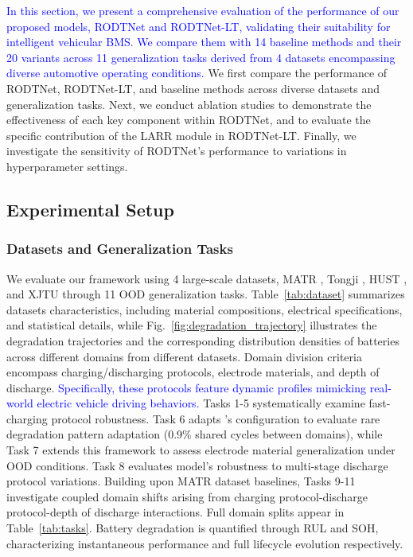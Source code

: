 \documentclass[lettersize,journal]{IEEEtran}
\newcommand{\rev}[1]{\textcolor{blue}{#1}}
\begin{document}
\rev{In this section, we present a comprehensive evaluation of the performance of our proposed models, RODTNet and RODTNet-LT, validating their suitability for intelligent vehicular BMS.
We compare them with 14 baseline methods and their 20 variants across 11 generalization tasks derived from 4 datasets encompassing diverse automotive operating conditions.}
We first compare the performance of RODTNet, RODTNet-LT, and baseline methods across diverse datasets and generalization tasks.
Next, we conduct ablation studies to demonstrate the effectiveness of each key component within RODTNet, and to evaluate the specific contribution of the LARR module in RODTNet-LT.
Finally, we investigate the sensitivity of RODTNet's performance to variations in hyperparameter settings.

\subsection{Experimental Setup}\label{subsec:experimental_setup}
  
\subsubsection{Datasets and Generalization Tasks}

We evaluate our framework using 4 large-scale datasets, MATR \cite{severson2019data, attia2020closed}, Tongji \cite{zhu2022data}, HUST \cite{D2EE01676A}, and XJTU \cite{wang2024physics} through 11 OOD generalization tasks. Table~\ref{tab:dataset} summarizes datasets characteristics, including material compositions, electrical specifications, and statistical details, while Fig.~\ref{fig:degradation_trajectory} illustrates the degradation trajectories and the corresponding distribution densities of batteries across different domains from different datasets. Domain division criteria encompass charging/discharging protocols, electrode materials, and depth of discharge. \rev{Specifically, these protocols feature dynamic profiles mimicking real-world electric vehicle driving behaviors.} Tasks 1-5 \cite{TAN2024103725,10522981} systematically examine fast-charging protocol robustness. Task 6 adapts \cite{TAN2024103725}'s configuration to evaluate rare degradation pattern adaptation (0.9\% shared cycles between domains), while Task 7 extends this framework to assess electrode material generalization under OOD conditions. Task 8 \cite{D2EE01676A} evaluates model's robustness to multi-stage discharge protocol variations. Building upon MATR dataset baselines, Tasks 9-11 investigate coupled domain shifts arising from charging protocol-discharge protocol-depth of discharge interactions. Full domain splits appear in Table~\ref{tab:tasks}. Battery degradation is quantified through RUL and SOH, characterizing instantaneous performance and full lifecycle evolution respectively.
\end{document}
